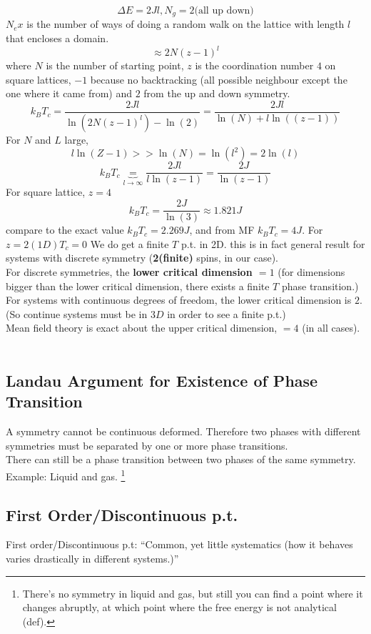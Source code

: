 \documentclass[11pt]{book}
\theoremstyle{definition}
\begin{document}
\[ \Delta E = 2Jl, N_g = 2 \text{(all up down)}\] 
$ N_ex $ is the number of ways of doing a random walk on the lattice with length $l $ that encloses a domain.
\[ \approx 2N(z-1)^{l} \] 
where $ N $ is the number of starting point, $ z $ is the coordination number $ 4 $ on square lattices, $ -1 $ because no backtracking (all possible neighbour except the one where it came from) and $ 2 $ from the up and down symmetry.
\[ k_BT_c = \frac{2Jl}{\ln(2N(z-1)^{l})-\ln(2)} = \frac{2Jl}{\ln(N)+l\ln((z-1))  }\] 
For $ N $ and $ L $ large, 
\[ l\ln(Z-1) >> \ln(N) = \ln(l^2) = 2 \ln(l)  \] 
\[ k_BT_c \underbrace{=}_{l \to \infty} \frac{2Jl}{l\ln(z-1)} = \frac{2J}{\ln(z-1) } \] 
For square lattice, $ z = 4 $
\[ k_BT_c = \frac{2J}{\ln(3)} \approx 1. 821J \] 
compare to the exact value $ k_BT_c = 2.269J $, and from MF $ k_BT_c = 4J $.
For $ z=2 (1D) T_c = 0$
We do get a finite $ T $ p.t. in 2D. this is in fact general result for systems with discrete symmetry (\textbf{2(finite)} spins, in our case). \\
For discrete symmetries, the \textbf{lower critical dimension $ = 1 $} (for dimensions bigger than the lower critical dimension, there exists a finite $ T $ phase transition.) \\
For systems with continuous degrees of freedom, the lower critical dimension is $ 2 $. (So continue systems must be in $ 3D $ in order to see a finite p.t.) \\
Mean field theory is exact about the upper critical dimension, $ = 4 $ (in all cases). \\
\\
\subsection{Landau Argument for Existence of Phase Transition}
A symmetry cannot be continuous deformed. Therefore two phases with different symmetries must be separated by one or more phase transitions. \\
There can still be a phase transition between two phases of the same symmetry. Example: Liquid and gas. \footnote{There's no symmetry in liquid and gas, but still you can find a point where it changes abruptly, at which point where the free energy is not analytical (def).}\\

\subsection{First Order/Discontinuous p.t.}%
First order/Discontinuous p.t: 
``Common, yet little systematics (how it behaves varies drastically in different systems.)''
\end{document}
